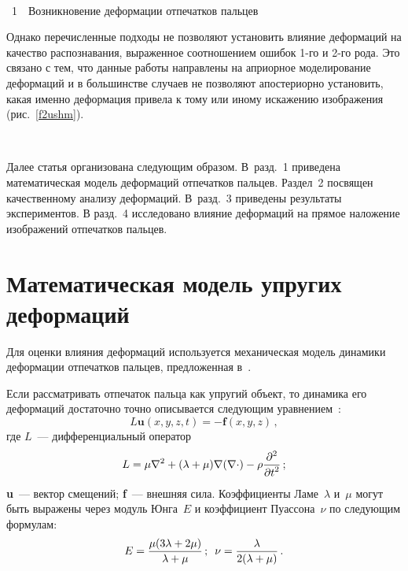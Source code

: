 \begin{multicols}{2}
\begin{center} %
\mbox{%
\epsfxsize=75mm %
}
\vspace*{6pt}

{{\figurename~1}\ \ \small{Возникновение деформации отпечатков пальцев}}
\end{center}
\vspace*{-6pt}


\bigskip
\addtocounter{figure}{1}

Однако перечисленные подходы не 
позволяют установить влияние деформаций на качество распознавания, выраженное 
соотношением ошибок 1-го и 2-го рода. Это связано с тем, что данные работы направлены 
на априорное моделирование деформаций и в большинстве случаев не позволяют 
апостериорно установить, какая именно деформация привела к тому или иному 
искажению изображения (рис.~\ref{f2ushm}).
      
\begin{figure*} %
\vspace*{1pt}
\begin{center}
\mbox{%
\epsfxsize=165.556mm
}
\end{center}
\vspace*{-9pt}
\end{figure*}
      
      Далее статья организована следующим образом. В~разд.~1 приведена 
математическая модель деформаций отпечатков пальцев. Раздел~2 посвящен 
качественному анализу деформаций. В~разд.~3 приведены результаты экспериментов.
В разд.~4 исследовано влияние деформаций на прямое наложение изображений отпечатков пальцев.
      
     \section{Математическая модель упругих деформаций}
      
      Для оценки влияния деформаций используется механическая модель динамики 
деформации отпечатков пальцев, предложенная в~\cite{11ushm}.
      
      Если рассматривать отпечаток пальца как упругий объект, то динамика его 
деформаций достаточно точно описывается следующим уравнением~\cite{12ushm}:
      \begin{equation}
      L\mathbf{u} (x,y,z,t) =-\mathbf{f}(x,y,z)\,,
      \label{e1ushm}
      \end{equation}
где $L$~--- дифференциальный оператор
$$
L=\mu\nabla^2+(\lambda+\mu)\nabla(\nabla\cdot)-\rho\displaystyle\frac{\displaystyle \partial^2\mathstrut}{\displaystyle \partial t^2\mathstrut}\,;
$$
\textbf{u}~--- вектор смещений; \textbf{f}~--- внешняя сила. Коэффициенты 
Ламе~$\lambda$ и~$\mu$ могут быть выражены через модуль Юнга~$E$ и коэффициент 
Пуассона~$\nu$ по следующим формулам:
$$
 E=\displaystyle\frac{\displaystyle \mu (3\lambda +2\mu)\mathstrut}{\displaystyle \lambda+\mu\mathstrut}\,;\enskip \nu =\displaystyle\frac{\displaystyle \lambda\mathstrut}{\displaystyle 2(\lambda+\mu)\mathstrut}\,.
$$
      

\end{multicols}
